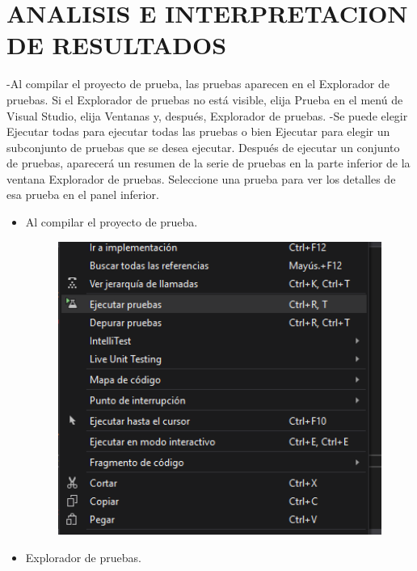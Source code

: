 \section{ANALISIS E INTERPRETACION DE RESULTADOS} 
-Al compilar el proyecto de prueba, las pruebas aparecen en el Explorador de pruebas. Si el Explorador de pruebas no está visible, elija Prueba en el menú de Visual Studio, elija Ventanas y, después, Explorador de pruebas.
-Se puede elegir Ejecutar todas para ejecutar todas las pruebas o bien Ejecutar para elegir un subconjunto de pruebas que se desea ejecutar. Después de ejecutar un conjunto de pruebas, aparecerá un resumen de la serie de pruebas en la parte inferior de la ventana Explorador de pruebas. Seleccione una prueba para ver los detalles de esa prueba en el panel inferior. 
\begin{itemize}
	\item Al compilar el proyecto de prueba.
	\begin{figure}[htb]
\begin{center}
\includegraphics[width=12cm]{./Imagenes/1-11}
\end{center}
\end{figure}
	\item Explorador de pruebas.
\begin{figure}[htb]
\begin{center}

\end{center}
\end{figure}
\end{itemize}

